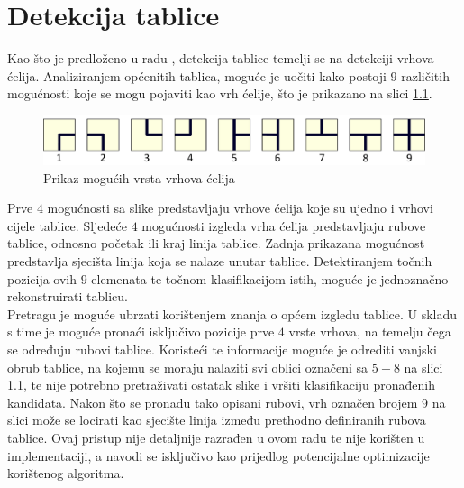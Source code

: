\documentclass[times, utf8, zavrsni, numeric]{fer}
\begin{document}
\chapter{Detekcija tablice}
Kao što je predloženo u radu \cite{conference:AutomaticTableDetectionInDocumentImages}, detekcija tablice temelji se na detekciji vrhova ćelija. 
Analiziranjem općenitih tablica, moguće je uočiti kako postoji $9$ različitih mogućnosti koje se mogu pojaviti kao vrh ćelije, što je prikazano na slici \ref{fig:corners}.

\begin{figure}[ht!]
    \centering
    \includegraphics[width=1.0\textwidth]{Images/Corners.pdf}
    \captionsetup{justification=centering}
    \caption{Prikaz mogućih vrsta vrhova ćelija}
    \label{fig:corners}
\end{figure}

Prve $4$ mogućnosti sa slike predstavljaju vrhove ćelija koje su ujedno i vrhovi cijele tablice. 
Sljedeće $4$ mogućnosti izgleda vrha ćelija predstavljaju rubove tablice, odnosno početak ili kraj linija tablice.
Zadnja prikazana mogućnost predstavlja sjecišta linija koja se nalaze unutar tablice.
Detektiranjem točnih pozicija ovih $9$ elemenata te točnom klasifikacijom istih, moguće je jednoznačno rekonstruirati tablicu.\\

Pretragu je moguće ubrzati korištenjem znanja o općem izgledu tablice.
U skladu s time je moguće pronaći isključivo pozicije prve $4$ vrste vrhova, na temelju čega se određuju rubovi tablice.
Koristeći te informacije moguće je odrediti vanjski obrub tablice, na kojemu se moraju nalaziti svi oblici označeni sa $5-8$ na slici \ref{fig:corners}, te nije potrebno pretraživati ostatak slike i vršiti klasifikaciju pronađenih kandidata.
Nakon što se pronađu tako opisani rubovi, vrh označen brojem $9$ na slici može se locirati kao sjecište linija između prethodno definiranih rubova tablice.
Ovaj pristup nije detaljnije razrađen u ovom radu te nije korišten u implementaciji, a navodi se isključivo kao prijedlog potencijalne optimizacije korištenog algoritma.
\end{document}
